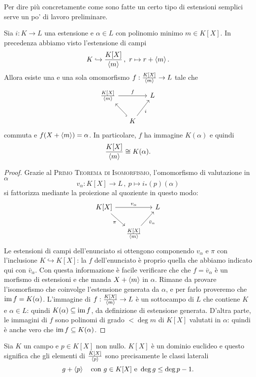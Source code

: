 Per dire più concretamente come sono fatte un certo tipo di estensioni semplici serve un po' di lavoro preliminare.

\begin{prop}\label{prop:IsomorfismoEstensioneGenerataDaElementoAlgebrico}
Sia $i : K \to L$ una estensione e $\alpha \in L$ con polinomio minimo $m \in K[X]$. In precedenza abbiamo visto l'estensione di campi
\[K \hookrightarrow \frac{K[X]}{\left\langle m\right\rangle}\,,\ r \mapsto r + \left\langle m\right\rangle .\]
Allora esiste una e una sola omomorfismo $f : \frac{K[X]}{\left\langle m\right\rangle} \to L$ tale che
\[\begin{tikzcd}[column sep=small]
\frac{K[X]}{\gen m} \ar["f", rr] & & L \\
& K \ar[hookrightarrow, ul] \ar["i", ur, swap] &
\end{tikzcd}\]
commuta e $f(X+ \left\langle m\right\rangle) = \alpha$. In particolare, $f$ ha immagine $K(\alpha)$ e quindi
\[\frac{K[X]}{\left\langle m\right\rangle} \cong K(\alpha) .\]
\end{prop}

\begin{proof}
Grazie al {\scshape Primo Teorema di Isomorfismo}, l'omomorfismo di valutazione in $\alpha$
\[v_\alpha : K[X] \to L \,,\ p \mapsto i_\ast (p)(\alpha)\]
si fattorizza mediante la proiezione al quoziente in questo modo:
\[\begin{tikzcd}[column sep=small]
K[X] \ar["\pi", dr, swap] \ar["{v_\alpha}", rr] & & L \\
& \frac{K[X]}{\gen m} \ar["{\bar v_\alpha}", ur, swap]
\end{tikzcd}\]
Le estensioni di campi dell'enunciato si ottengono componendo $v_\alpha$ e $\pi$ con l'inclusione $K \hookrightarrow K[X]$: la $f$ dell'enunciato è proprio quella che abbiamo indicato qui con $\bar v_\alpha$. Con questa informazione è facile verificare che che $f = \bar v_\alpha$ è un morfismo di estensioni e che manda $X + \left\langle m\right\rangle$ in $\alpha$.\newline
Rimane da provare l'isomorfismo che coinvolge l'estensione generata da $\alpha$, e per farlo proveremo che $\operatorname{im} f = K(\alpha)$. L'immagine di $f : \frac{K[X]}{\left\langle m\right\rangle} \to L$ è un sottocampo di $L$ che contiene $K$ e $\alpha \in L$: quindi $K(\alpha) \subseteq \operatorname{im} f$, da definizione di estensione generata. D'altra parte, le immagini di $f$ sono polinomi di grado $< \deg m$ di $K[X]$ valutati in $\alpha$: quindi è anche vero che $\operatorname{im} f \subseteq K(\alpha)$.
\end{proof}

\begin{rich}
Sia $K$ un campo e $p \in K[X]$ non nullo. $K[X]$ è un dominio euclideo e questo significa che gli elementi di $\frac{K[X]}{\left\langle p\right\rangle}$ sono precisamente le classi laterali
\[g + \left\langle p\right\rangle \quad\text{con } g \in K[X] \text{ e } \deg g \le \deg p -1 .\]
\end{rich}

